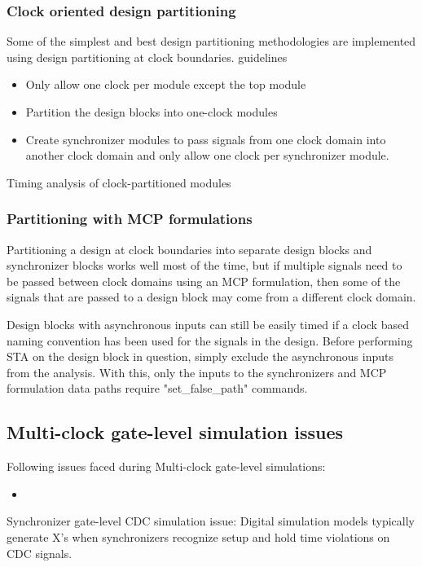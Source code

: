 \subsubsection{Clock oriented design partitioning}
Some of the simplest and best design partitioning methodologies are implemented using design partitioning at clock boundaries.
guidelines
\begin{itemize}
	\item Only allow one clock per module except the top module
	\item Partition the design blocks into one-clock modules
	\item Create synchronizer modules to pass signals from one clock domain into another clock domain and only allow one clock per synchronizer module.
\end{itemize}

Timing analysis of clock-partitioned modules

\subsubsection{Partitioning with MCP formulations}
Partitioning a design at clock boundaries into separate design blocks and synchronizer blocks works well most of the time, but if multiple signals need to be passed between clock domains using an MCP formulation, then some of the signals that are passed to a design block may come from a different clock domain.

\par Design blocks with asynchronous inputs can still be easily timed if a clock based naming convention has been used for the signals in the design. Before performing STA on the design block in question, simply exclude the asynchronous inputs from the analysis. With this, only the inputs to the synchronizers and MCP formulation data paths require "set\_false\_path" commands.

\subsection{Multi-clock gate-level simulation issues}

Following issues faced during Multi-clock gate-level simulations: 
\begin{itemize}
	\item 
\end{itemize}
Synchronizer gate-level CDC simulation issue: Digital simulation models typically generate X's when synchronizers recognize setup and hold time violations on CDC signals. 

